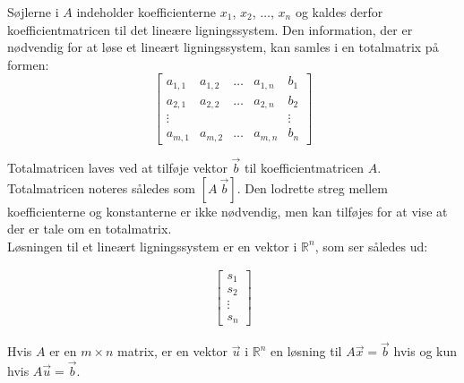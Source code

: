 Søjlerne i $A$ indeholder koefficienterne $x_1$, $x_2$, $\dots $, $x_n$ og kaldes derfor koefficientmatricen til det lineære ligningssystem. 
Den information, der er nødvendig for at løse et lineært ligningssystem, kan samles i en totalmatrix på formen:
\[
\left[
\begin{array}{cccc|c}
a_{1,1} & a_{1,2} & \dots & a_{1,n} & b_1 \\
a_{2,1} & a_{2,2} & \dots & a_{2,n} & b_2 \\
\vdots  &         &       &         & \vdots \\
a_{m,1} & a_{m,2} & \dots & a_{m,n} & b_n
\end{array}
\right]
\]

Totalmatricen laves ved at tilføje vektor $\vec{b}$ til koefficientmatricen $A$. Totalmatricen noteres således som $[A \ \vec{b}]$. Den lodrette streg mellem koefficienterne og konstanterne er ikke nødvendig, men kan tilføjes for at vise at der er tale om en totalmatrix.\\

Løsningen til et lineært ligningssystem er en vektor i $\mathds{R}^n$, som ser således ud:

\begin{align*}
\begin{bmatrix}
s_1 \\
s_2 \\
\vdots \\
s_n
\end{bmatrix}
\end{align*}

Hvis $A$ er en $m \times n$ matrix, er en vektor $\vec{u}$  i $\mathds{R}^n$ en løsning til $A \vec{x}= \vec{b}$ hvis og kun hvis $A \vec{u}= \vec{b}$.

